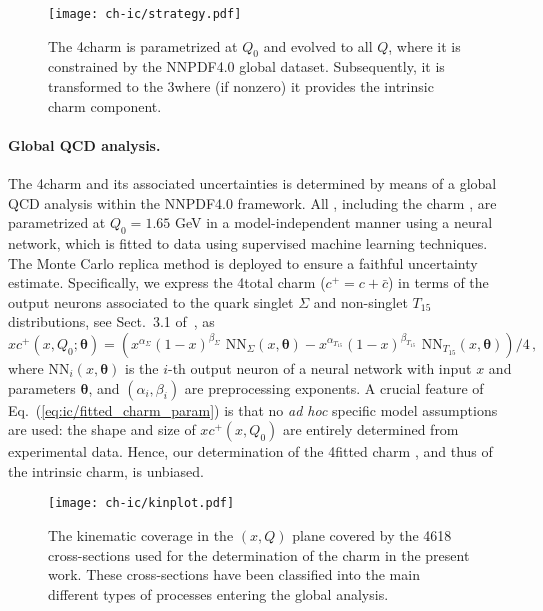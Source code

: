 \begin{figure}[h]
\begin{center}
  \texttt{[image: ch-ic/strategy.pdf]}
 \end{center}
\vspace{-0.2cm}
\caption{The 4\fns charm \pdf is parametrized  at $Q_0$
  and evolved to all  $Q$, where it is  constrained by the NNPDF4.0
  global dataset. 
 Subsequently, it is transformed to the 3\fns where (if nonzero) it
 provides the intrinsic charm component.
  \label{fig:ic/strategy}
}
\end{figure}

\paragraph{Global QCD analysis.}
%
The 4\fns charm \pdf and its associated
uncertainties is determined by means of a global QCD analysis
within the NNPDF4.0 framework.
%
All \pdfs, including the charm \pdf, are  parametrized at $Q_0=1.65$ GeV in 
a model-independent manner using a neural network, which is fitted to data using 
supervised machine learning techniques.
The Monte Carlo replica method
is deployed to ensure a faithful uncertainty estimate.
%
Specifically, we express the 4\fns total charm \pdf ($c^+=c+\bar{c}$)  in terms of the output neurons associated to the quark singlet $\Sigma$ and non-singlet $T_{15}$
distributions, see Sect.~3.1 of~\cite{Ball:2021leu}, as
\begin{equation}
\label{eq:ic/fitted_charm_param}
xc^+(x,Q_0;{\boldsymbol \theta}) =
\left( x^{\alpha_{\Sigma}}(1-x)^{\beta_{\Sigma}} \textrm{ NN}_{\Sigma}(x,{\boldsymbol \theta})-
x^{\alpha_{T_{15}}}(1-x)^{\beta_{T_{15}}} \textrm{ NN}_{T_{15}}(x,{\boldsymbol \theta})
\right)/4 \, ,
\end{equation}
where $\textrm{NN}_{i}(x,{\boldsymbol \theta})$ is the $i$-th output neuron of
a neural network with input $x$ and  parameters ${\boldsymbol \theta}$, and 
$\left(\alpha_i,\beta_i\right)$ are preprocessing exponents.
%
A crucial feature of Eq.~(\ref{eq:ic/fitted_charm_param}) is that no \textit{
ad hoc} specific model assumptions are used: the shape and size of
$xc^+(x,Q_0)$ are entirely determined from experimental data.
%
Hence, our determination of the 4\fns fitted charm \pdf, and thus of the intrinsic charm, is unbiased.
%

\begin{figure}[t]
\begin{center}
  \texttt{[image: ch-ic/kinplot.pdf]}
 \end{center}
\vspace{-0.8cm}
\caption{The kinematic coverage in the $(x,Q)$ plane
  covered by the 4618 cross-sections used for the
  determination of the charm \pdf in the present work.
  These cross-sections have been classified into the main different
  types of processes entering the global analysis.
  \label{fig:ic/kinplot}
}
\end{figure}

